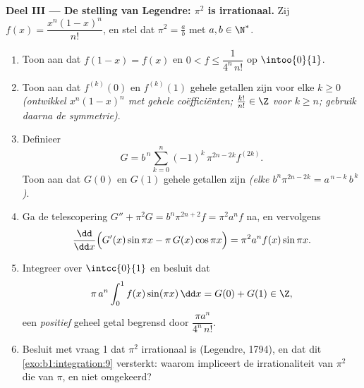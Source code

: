 \begin{problem}
\medskip
\noindent\textbf{Deel III --- De stelling van Legendre: $\pi^2$
is irrationaal.} Zij $f(x) = \dfrac{x^n (1 - x)^n}{n!}$, en stel
dat $\pi^2 = \frac ab$ met $a, b \in \N^*$.
\begin{enumerate}[resume]
  \item Toon aan dat $f(1 - x) = f(x)$ en $0 < f \leq
        \dfrac{1}{4^n\,n!}$ op $\intoo{0}{1}$.
  \item Toon aan dat $f^{(k)}(0)$ en $f^{(k)}(1)$ gehele getallen
        zijn voor elke $k \geq 0$ \emph{(ontwikkel $x^n(1-x)^n$ met
        gehele coëfficiënten; $\frac{k!}{n!} \in \Z$ voor $k \geq
        n$; gebruik daarna de symmetrie)}.
  \item Definieer
        \[
        G = b^{\,n} \sum_{k=0}^{n} (-1)^k\,
        \pi^{2n - 2k} f^{(2k)} .
        \]
        Toon aan dat $G(0)$ en $G(1)$ gehele getallen zijn
        \emph{(elke $b^n \pi^{2n-2k} = a^{\,n-k}\,b^{\,k}$)}.
  \item Ga de telescopering $G'' + \pi^2 G = b^n \pi^{2n+2} f =
        \pi^2 a^n f$ na, en vervolgens
        \[
        \frac{\dd}{\dd x}\Bigl(G'(x)\sin \pi x - \pi\,G(x)\cos
        \pi x\Bigr) = \pi^2 a^n f(x)\sin \pi x .
        \]
  \item Integreer over $\intcc{0}{1}$ en besluit dat
        \[
        \pi\,a^n \int_0^1 f(x)\sin(\pi x)\,\dd x = G(0) + G(1)
        \in \Z ,
        \]
        een \emph{positief} geheel getal begrensd door
        $\dfrac{\pi a^n}{4^n\,n!}$.
  \item Besluit met vraag 1 dat $\pi^2$ irrationaal is (Legendre,
        1794), en dat dit \cref{exo:b1:integration:9} versterkt:
        waarom impliceert de irrationaliteit van $\pi^2$ die van
        $\pi$, en niet omgekeerd?
\end{enumerate}


\end{problem}
